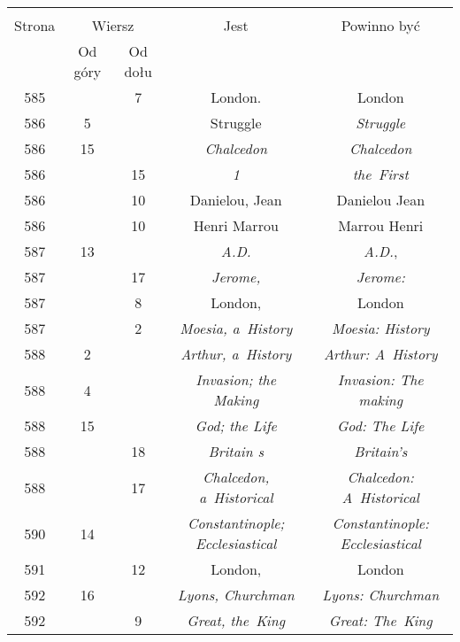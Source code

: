 \documentclass[a4paper,11pt]{article}
\begin{document}
\begin{center}
  \begin{tabular}{|c|c|c|c|c|}
    \hline
    & \multicolumn{2}{c|}{} & & \\
    Strona & \multicolumn{2}{c|}{Wiersz} & Jest
                              & Powinno być \\ \cline{2-3}
    & Od góry & Od dołu & & \\
    \hline
    585 & &  7 & London. & London \\
    586 &  5 & & Struggle & \emph{Struggle} \\
    586 & 15 & & \emph{Chalcedon} & \emph{Chalcedon} \\
    586 & & 15 & \emph{1} & \emph{the~First} \\
    586 & & 10 & Danielou, Jean & Danielou Jean \\
    586 & & 10 & Henri Marrou & Marrou Henri \\
    587 & 13 & & \emph{A.D.} & \emph{A.D.}, \\
    587 & & 17 & \emph{Jerome,} & \emph{Jerome:} \\
    587 & &  8 & London, & London \\
    587 & &  2 & \emph{Moesia, a~History} & \emph{Moesia: History} \\
    588 &  2 & & \emph{Arthur, a~History} & \emph{Arthur: A~History} \\
    588 &  4 & & \emph{Invasion; the Making}
           & \emph{Invasion: The making} \\
    588 & 15 & & \emph{God; the Life} & \emph{God: The Life} \\
    588 & & 18 & \emph{Britain s} & \emph{Britain's} \\
    588 & & 17 & \emph{Chalcedon, a~Historical}
           & \emph{Chalcedon: A~Historical} \\
    590 & 14 & & \emph{Constantinople; Ecclesiastical}
           & \emph{Constantinople: Ecclesiastical} \\
    591 & & 12 & London, & London \\
    592 & 16 & & \emph{Lyons, Churchman} & \emph{Lyons: Churchman} \\
    592 & &  9 & \emph{Great, the~King} & \emph{Great: The~King} \\

\end{tabular}
\end{center}
\end{document}

